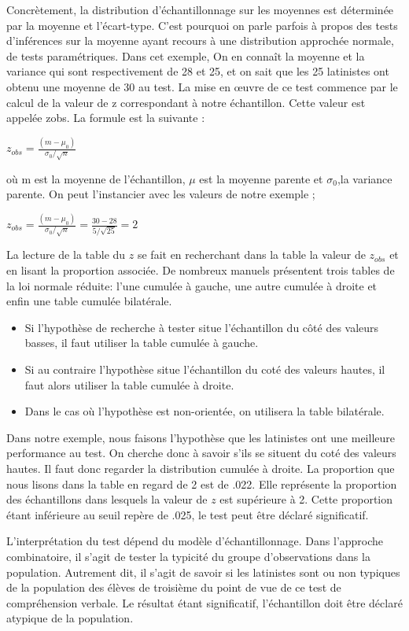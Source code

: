 \documentclass[]{book}
\providecommand{\tightlist}{%
  \setlength{\itemsep}{0pt}\setlength{\parskip}{0pt}}
\theoremstyle{definition}
\theoremstyle{definition}
\theoremstyle{definition}
\theoremstyle{remark}
\begin{document}
Concrètement, la distribution d'échantillonnage sur les moyennes est
déterminée par la moyenne et l'écart-type. C'est pourquoi on parle
parfois à propos des tests d'inférences sur la moyenne ayant recours à
une distribution approchée normale, de tests paramétriques. Dans cet
exemple, On en connaît la moyenne et la variance qui sont respectivement
de 28 et 25, et on sait que les 25 latinistes ont obtenu une moyenne de
30 au test. La mise en œuvre de ce test commence par le calcul de la
valeur de z correspondant à notre échantillon. Cette valeur est appelée
zobs. La formule est la suivante :

\(z_{obs}=\frac{(m-\mu _{0})}{\sigma _{0}/\sqrt{n}}\)

où m est la moyenne de l'échantillon, \(\mu\) est la moyenne parente et
\(\sigma_{0}\),la variance parente. On peut l'instancier avec les
valeurs de notre exemple ;

\(z_{obs}=\frac{(m-\mu _{0})}{\sigma _{0}/\sqrt{n}}=\frac{30-28}{5/\sqrt{25}} = 2\)

La lecture de la table du \(z\) se fait en recherchant dans la table la
valeur de \(z_{obs}\) et en lisant la proportion associée. De nombreux
manuels présentent trois tables de la loi normale réduite: l'une cumulée
à gauche, une autre cumulée à droite et enfin une table cumulée
bilatérale.

\begin{itemize}
\tightlist
\item
  Si l'hypothèse de recherche à tester situe l'échantillon du côté des
  valeurs basses, il faut utiliser la table cumulée à gauche.
\item
  Si au contraire l'hypothèse situe l'échantillon du coté des valeurs
  hautes, il faut alors utiliser la table cumulée à droite.
\item
  Dans le cas où l'hypothèse est non-orientée, on utilisera la table
  bilatérale.
\end{itemize}

Dans notre exemple, nous faisons l'hypothèse que les latinistes ont une
meilleure performance au test. On cherche donc à savoir s'ils se situent
du coté des valeurs hautes. Il faut donc regarder la distribution
cumulée à droite. La proportion que nous lisons dans la table en regard
de 2 est de .022. Elle représente la proportion des échantillons dans
lesquels la valeur de \(z\) est supérieure à 2. Cette proportion étant
inférieure au seuil repère de .025, le test peut être déclaré
significatif.

L'interprétation du test dépend du modèle d'échantillonnage. Dans
l'approche combinatoire, il s'agit de tester la typicité du groupe
d'observations dans la population. Autrement dit, il s'agit de savoir si
les latinistes sont ou non typiques de la population des élèves de
troisième du point de vue de ce test de compréhension verbale. Le
résultat étant significatif, l'échantillon doit être déclaré atypique de
la population.
\end{document}
